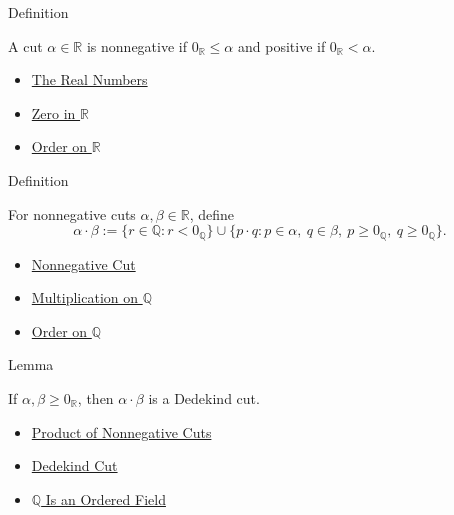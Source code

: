 \begin{definitionbox}{Definition}
\begin{definition}
\label{def:nonnegative-cut}
A cut $\alpha\in\mathbb{R}$ is nonnegative if $0_{\mathbb{R}}\le\alpha$ and
positive if $0_{\mathbb{R}}<\alpha$.
\end{definition}
\end{definitionbox}

\begin{dependencies}
\begin{itemize}
  \item \hyperref[def:reals]{The Real Numbers}
  \item \hyperref[def:zero-in-r]{Zero in $\mathbb{R}$}
  \item \hyperref[def:order-on-r]{Order on $\mathbb{R}$}
\end{itemize}
\end{dependencies}

\begin{definitionbox}{Definition}
\begin{definition}
\label{def:product-nonnegative-on-r}
For nonnegative cuts $\alpha,\beta\in\mathbb{R}$, define
\[
\alpha\cdot\beta
:=
\{r\in\mathbb{Q}:r<0_{\mathbb{Q}}\}
\cup
\{p\cdot q:p\in\alpha,\ q\in\beta,\ p\ge 0_{\mathbb{Q}},\ q\ge 0_{\mathbb{Q}}\}.
\]
\end{definition}
\end{definitionbox}

\begin{dependencies}
\begin{itemize}
  \item \hyperref[def:nonnegative-cut]{Nonnegative Cut}
  \item \hyperref[def:multiplication-on-q-classes]{Multiplication on $\mathbb{Q}$}
  \item \hyperref[def:order-on-q]{Order on $\mathbb{Q}$}
\end{itemize}
\end{dependencies}

\begin{lemmabox}{Lemma}
\begin{lemma}
\label{lem:product-nonnegative-is-a-cut}
If $\alpha,\beta\ge 0_{\mathbb{R}}$, then $\alpha\cdot\beta$ is a Dedekind cut.
\end{lemma}
\end{lemmabox}

\begin{dependencies}
\begin{itemize}
  \item \hyperref[def:product-nonnegative-on-r]{Product of Nonnegative Cuts}
  \item \hyperref[def:dedekind-cut]{Dedekind Cut}
  \item \hyperref[thm:q-is-an-ordered-field]{$\mathbb{Q}$ Is an Ordered Field}
\end{itemize}
\end{dependencies}


